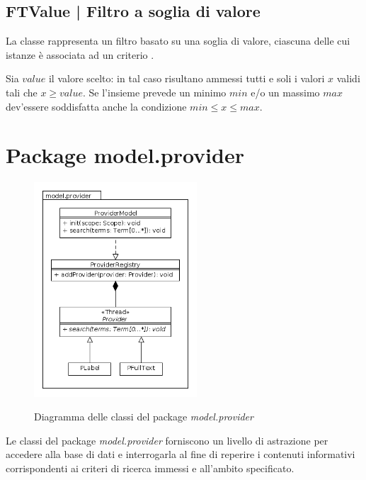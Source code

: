 \documentclass[10pt,a4paper,headinclude,footinclude,hidelinks]{scrreprt} %
\begin{document}
	\subsection[FTValue]{FTValue | Filtro a soglia di valore}
	\label{sec:stage:design:model.filter:value-filter}
	La classe \textit{} rappresenta un filtro basato su una soglia di valore, ciascuna delle cui istanze è associata ad un criterio \textit{}.

	Sia $value$ il valore scelto: in tal caso risultano ammessi tutti e soli i valori $x$ validi tali che $x \geq value$. Se l'insieme prevede un minimo $min$ e/o un massimo $max$ dev'essere soddisfatta anche la condizione $min \leq x \leq max$.

	\section{Package model.provider}
	\label{sec:stage:design:model.provider}

	\begin{figure}[ht]
		\begin{center}
	    	\includegraphics[height=8cm]{class/model_provider.png}
			\label{gfx:package:model:provider}
			\caption{Diagramma delle classi del package \textit{model.provider}}
		\end{center}
	\end{figure}

	Le classi del package \textit{model.provider} forniscono un livello di astrazione per accedere alla base di dati e interrogarla al fine di reperire i contenuti informativi corrispondenti ai criteri di ricerca immessi e all'ambito specificato.
\end{document}

